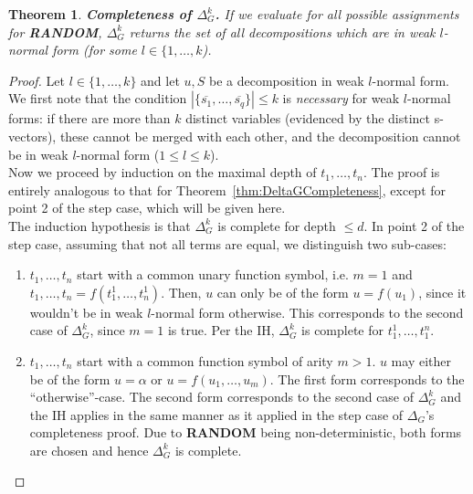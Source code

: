 \documentclass[a4paper, 11pt]{report}
\newtheorem{theorem}{Theorem}
\begin{document}

\begin{theorem}
\textbf{Completeness of $\Delta_G^k$.}
If we evaluate for all possible assignments for \textbf{RANDOM}, $\Delta_G^k$ returns the set of all decompositions which are in weak $l$-normal form (for some $l \in \{1,\dots,k$).
\label{thm:DeltaGkCompletenss}
\end{theorem}

\begin{proof}
Let $l \in \{1,\dots,k\}$ and let $u,S$ be a decomposition in weak $l$-normal form.\\

We first note that the condition $|\{\overline{s_1},\dots,\overline{s_q}\}| \leq k$ is {\em necessary} for weak $l$-normal forms: if there are more than $k$ distinct variables (evidenced by the distinct s-vectors), these cannot be merged with each other, and the decomposition cannot be in weak $l$-normal form ($1 \leq l \leq k$).\\

Now we proceed by induction on the maximal depth of $t_1,\dots,t_n$. The proof is entirely analogous to that for Theorem~\ref{thm:DeltaGCompleteness}, except for point 2 of the step case, which will be given here.\\

\noindent
The induction hypothesis is that $\Delta_G^k$ is complete for depth $\leq d$. In point 2 of the step case, assuming that not all terms are equal, we distinguish two sub-cases:
  \begin{enumerate}
    \item $t_1,\dots,t_n $ start with a common unary function symbol, i.e. $m = 1$ and $t_1,\dots,t_n = f(t_1^1,\dots,t_n^1)$. Then, $u$ can only be of the form $u=f(u_1)$, since it wouldn't be in weak $l$-normal form otherwise.
    This corresponds to the second case of $\Delta_G^k$, since $m = 1$ is true. Per the IH, $\Delta_G^k$ is complete for $t_1^1,\dots,t_1^n$.
    \item $t_1,\dots,t_n$ start with a common function symbol of arity $m > 1$. $u$ may either be of the form $u=\alpha$ or $u=f(u_1,\dots,u_m)$. The first form corresponds to the ``otherwise''-case. The second form corresponds to the second case of $\Delta_G^k$ and the IH applies in the same manner as it applied in the step case of $\Delta_G$'s completeness proof. Due to \textbf{RANDOM} being non-deterministic, both forms are chosen and hence $\Delta_G^k$ is complete.
  \end{enumerate}
\end{proof}
\end{document}
